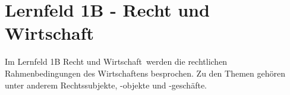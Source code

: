 \section{Lernfeld 1B - Recht und Wirtschaft}

Im Lernfeld 1B \ql Recht und Wirtschaft\qr\ werden die rechtlichen Rahmenbedingungen des Wirtschaftens besprochen. Zu den Themen gehören unter anderem Rechtssubjekte, -objekte und -geschäfte.






